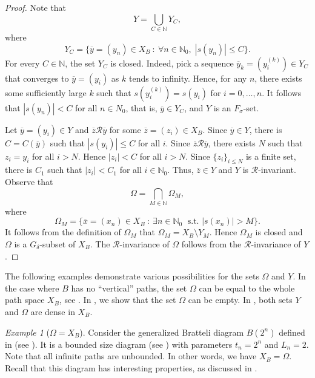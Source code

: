 \documentclass[11pt,reqno]{amsart}
\theoremstyle{definition}
\theoremstyle{remark}
\newtheorem{example}[definition]{Example}
\theoremstyle{plain}
\def\ov{\overline}
\newcommand{\N}{\mathbb N}
\numberwithin{equation}{section}
\begin{document}
\begin{proof}
Note that     
\begin{equation*}
    Y = \bigcup_{C \in \mathbb{N}} Y_C,
\end{equation*}
where
$$
Y_C = \{\ov y= (y_n) \in X_B \ : \ \forall n \in \mathbb{N}_0, \; | s(y_n) |\leq C\}.
$$
For every $C \in \mathbb{N}$, the set $Y_C$ is closed. Indeed, pick a sequence $\ov y_k = (y^{(k)}_i) \in Y_C$ that converges to $\ov y = (y_i)$ as $k$ tends to infinity. Hence, for any $n$, there exists some sufficiently large $k$ such that $s(y^{(k)}_i) = s(y_i)$ for $i = 0, \ldots, n$. It follows that $|s(y_n)| < C$ for all $n \in N_0$, that is, $\ov y \in Y_C$, and $Y$ is an $F_{\sigma}$-set.

Let $\ov y = (y_i) \in Y$ and $\ov z \mathcal{R} \ov y$ for some $\ov z = (z_i) \in X_B$. Since $\ov y \in Y$, there is $C = C(\ov y)$ such that $| s(y_i) |\leq C$ for all $i$.
Since $\ov z \mathcal{R} \ov y$, there exists $N$ such that $z_i = y_i$ for all $i > N$. Hence $|z_i| < C$ for all $i > N$. Since $\{z_i\}_{i \leq N}$ is a finite set, there is $C_1$ such that $|z_i| < C_1$ for all $i \in \N_0$. Thus, $\ov z \in Y$ and $Y$ is $\mathcal{R}$-invariant. Observe that
$$
\Omega = \bigcap_{M \in \mathbb{N}} \Omega_M,
$$
where
$$
\Omega_M = \{\ov x= (x_n) \in X_B \ :\  \exists n \in \N_0 \; \mbox{ s.t. } |s(x_n)| > M\}. 
$$ 
It follows from the definition of $\Omega_M$ that $\Omega_M = X_B \setminus Y_M$. Hence $\Omega_M$ is closed and $\Omega$ is a $G_{\delta}$-subset of $X_B$. The $\mathcal{R}$-invariance of $\Omega$ follows from the $\mathcal{R}$-invariance of $Y$.
\end{proof}

The following examples demonstrate various possibilities for the sets $\Omega$ and $Y$. In the case where $B$ has no ``vertical'' paths, the set $\Omega$ can be equal to the whole path space $X_B$, see . In , we show that the set $\Omega$ can be empty. In , both sets $Y$ and $\Omega$ are dense in $X_B$.

\begin{example}[$\Omega = X_B$]\label{Ex:OmegaisXB} Consider the generalized Bratteli diagram $B(2^n)$ defined in  (see ). It is a bounded size diagram (see ) with parameters $t_n = 2^n$ and $L_n = 2$. Note that all infinite paths are unbounded. In other words, we have $X_B = \Omega$. Recall that this diagram has interesting properties, as discussed in . 

\end{example}
\end{document}
